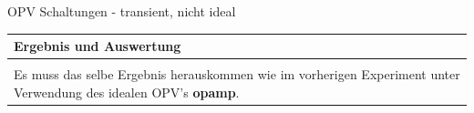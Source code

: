 \begin{frame}[t]{OPV Schaltungen - transient, nicht ideal}
\begin{spacing}{0.9}
\begin{tiny}
\begin{table}[h!]
      \end{table}

    \end{tiny} \end{spacing}


  \begin{spacing}{0.9} \begin{tiny}
      \begin{table}[h!]
        \begin{tabular}{p{10cm} }
          \hline
          \textbf{Ergebnis und Auswertung} \\
          \hline                           \\
          Es muss das selbe Ergebnis herauskommen wie im vorherigen Experiment unter Verwendung des idealen OPV's \textbf{opamp}.
        \end{tabular}
      \end{table}
    \end{tiny} \end{spacing}

\end{frame}


